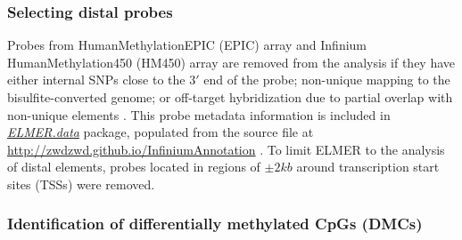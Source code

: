\subsubsection*{Selecting distal probes} 
Probes from HumanMethylationEPIC (EPIC) array and Infinium HumanMethylation450 (HM450) array are removed from the analysis if they have either internal SNPs close to the $3'$ end of the probe; non-unique mapping to the bisulfite-converted genome; or off-target hybridization due to partial overlap with non-unique elements \cite{doi:10.1093/nar/gkw967}. This probe metadata information is
included in \href{https://github.com/tiagochst/ELMER.data}{\textit{ELMER.data}} package, populated from the source file at \url{http://zwdzwd.github.io/InfiniumAnnotation} \cite{doi:10.1093/nar/gkw967}.
To limit ELMER to the analysis of distal elements, probes located in regions of $\pm2 kb$ around transcription start sites (TSSs) were removed.
% 
% 

\subsubsection*{Identification of differentially methylated CpGs (DMCs)}

